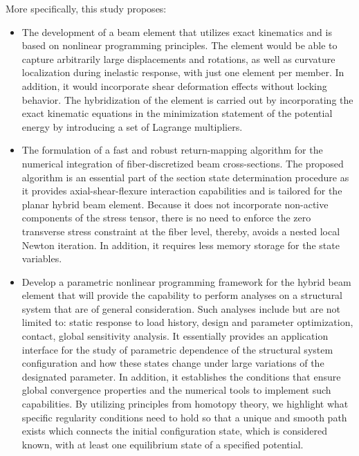 More specifically, this study proposes:
\begin{itemize}
	\item The development of a beam element that utilizes exact kinematics and is 
	based on nonlinear programming principles. The element would be able to capture 
	arbitrarily large displacements and rotations, as well as curvature localization 
	during inelastic response, with just one element per member. In addition, it would 
	incorporate shear deformation effects without locking behavior. The hybridization 
	of the element is carried out by incorporating the exact kinematic equations in 
	the minimization statement of the potential energy by introducing a set of 
	Lagrange multipliers.
	
	\item The formulation of a fast and robust return-mapping algorithm for the 
	numerical integration of fiber-discretized beam cross-sections. The proposed 
	algorithm is an essential part of the section state determination procedure as it 
	provides axial-shear-flexure interaction capabilities and is tailored for the 
	planar hybrid beam element. Because it does not incorporate non-active components 
	of the stress tensor, there is no need to enforce the zero transverse stress 
	constraint at the fiber level, thereby, avoids a nested local Newton iteration. In 
	addition, it requires less memory storage for the state variables. 
	
	\item Develop a parametric nonlinear programming framework for the hybrid beam 
	element that will provide the capability to perform analyses on a structural 
	system that are of general consideration. Such analyses include but are not 
	limited to: static response to load history, design and parameter optimization, 
	contact, global sensitivity analysis. It essentially provides an application 
	interface for the study of parametric dependence of the structural system 
	configuration and how these states change under large variations of the designated 
	parameter. In addition, it establishes the conditions that ensure global 
	convergence properties and the numerical tools to implement such capabilities. By 
	utilizing principles from homotopy theory, we highlight what specific
	regularity conditions need to hold so that a unique and smooth path exists which
	connects the initial configuration state, which is considered known, with at least 
	one equilibrium state of a specified potential. 
	

\end{itemize}

